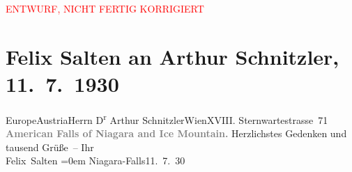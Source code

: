 
\begin{center}
            \textcolor{red}{ENTWURF, NICHT FERTIG KORRIGIERT}
                      \end{center}
            
         \renewcommand{\erwaehnteOrte}{Orte: Buffalo, Europa, Niagara Falls, Wien, Österreich}
         \renewcommand{\erwaehnteWerke}{}
               \section[Felix Salten an Arthur Schnitzler, 11. 7. 1930]{ Felix Salten an Arthur Schnitzler, 11. 7. 1930}\nopagebreak{}\rehead{ }\begin{ledgroupsized}[t]{13cm}\normalsize\beginnumbering \toendnotes[C]{\smallbreak\pagebreak[2]} 
\pstart{}{\pb}Europe\pend{}\pstart{}Austria\pend{}\pstart{}Herrn D\textsuperscript{r} Arthur Schnitzler\pend{}\pstart{}Wien\pend{}\pstart{}XVIII. Sternwartestrasse 71\pend{}{\bigskip}\pstart
           \noindent{}\centering{}{\pb}\textcolor{gray}{\textbf{American Falls of Niagara and Ice
                     Mountain.}}\pend
           \pstart
           {\pb}Herzlichstes Gedenken und tausend Grüße –\pend
           \pstart
           Ihr {\\[\baselineskip]}\spacefill\mbox{Felix Salten}\pend
           \leftskip=0em{}\pstart
           Niagara-Falls11. 7. 30\pend
           
         
         \endnumbering{}\end{ledgroupsized}\begin{anhang}\end{anhang}\newcommand{\dateiname}{L03593}\newcommand{\titel}{Felix Salten an Arthur Schnitzler, 11. 7. 1930}\newcommand{\editorInnen}{Martin Anton Müller und Laura Untner}
      